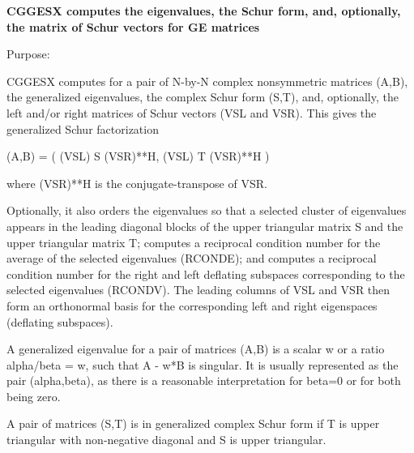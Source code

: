 {\bfseries  C\+G\+G\+E\+S\+X computes the eigenvalues, the Schur form, and, optionally, the matrix of Schur vectors for G\+E matrices} 

 \begin{DoxyParagraph}{Purpose\+: }
\begin{DoxyVerb} CGGESX computes for a pair of N-by-N complex nonsymmetric matrices
 (A,B), the generalized eigenvalues, the complex Schur form (S,T),
 and, optionally, the left and/or right matrices of Schur vectors (VSL
 and VSR).  This gives the generalized Schur factorization

      (A,B) = ( (VSL) S (VSR)**H, (VSL) T (VSR)**H )

 where (VSR)**H is the conjugate-transpose of VSR.

 Optionally, it also orders the eigenvalues so that a selected cluster
 of eigenvalues appears in the leading diagonal blocks of the upper
 triangular matrix S and the upper triangular matrix T; computes
 a reciprocal condition number for the average of the selected
 eigenvalues (RCONDE); and computes a reciprocal condition number for
 the right and left deflating subspaces corresponding to the selected
 eigenvalues (RCONDV). The leading columns of VSL and VSR then form
 an orthonormal basis for the corresponding left and right eigenspaces
 (deflating subspaces).

 A generalized eigenvalue for a pair of matrices (A,B) is a scalar w
 or a ratio alpha/beta = w, such that  A - w*B is singular.  It is
 usually represented as the pair (alpha,beta), as there is a
 reasonable interpretation for beta=0 or for both being zero.

 A pair of matrices (S,T) is in generalized complex Schur form if T is
 upper triangular with non-negative diagonal and S is upper
 triangular.\end{DoxyVerb}
 
\end{DoxyParagraph}

